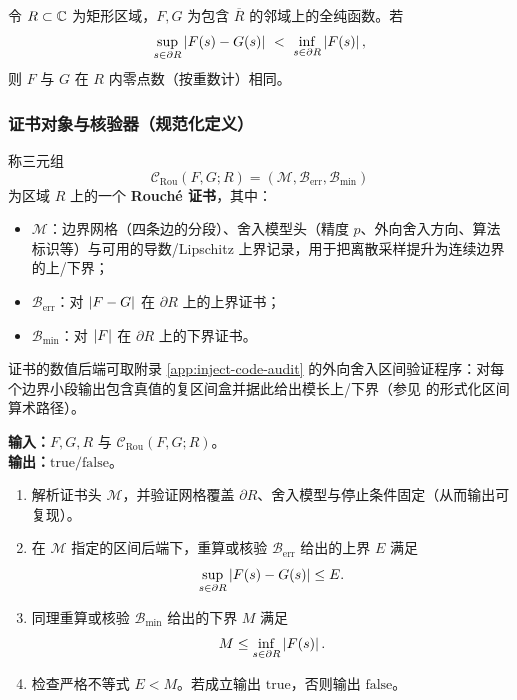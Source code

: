 \begin{lemma}\label{lem:rouche}
令 $R\subset\mathbb{C}$ 为矩形区域，$F,G$ 为包含 $\overline{R}$ 的邻域上的全纯函数。若
$$
\sup_{s\in\partial R}\left\lvert F(s)-G(s)\right\rvert\ <\ \inf_{s\in\partial R}\left\lvert F(s)\right\rvert,
$$
则 $F$ 与 $G$ 在 $R$ 内零点数（按重数计）相同。
\end{lemma}

\subsubsection{证书对象与核验器（规范化定义）}

\begin{definition}\label{def:rouche-cert}
称三元组
$$
\mathcal{C}_{\mathrm{Rou}}(F,G;R)=(\mathcal{M},\mathcal{B}_{\mathrm{err}},\mathcal{B}_{\min})
$$
为区域 $R$ 上的一个 \textbf{Rouché 证书}，其中：
\begin{itemize}
  \item $\mathcal{M}$：边界网格（四条边的分段）、舍入模型头（精度 $p$、外向舍入方向、算法标识等）与可用的导数/Lipschitz 上界记录，用于把离散采样提升为连续边界的上/下界；
  \item $\mathcal{B}_{\mathrm{err}}$：对 $\left\lvert F-G\right\rvert$ 在 $\partial R$ 上的上界证书；
  \item $\mathcal{B}_{\min}$：对 $\left\lvert F\right\rvert$ 在 $\partial R$ 上的下界证书。
\end{itemize}
证书的数值后端可取附录 \ref{app:inject-code-audit} 的外向舍入区间验证程序：对每个边界小段输出包含真值的复区间盒并据此给出模长上/下界（参见 \cite{DaumasLesterMunoz2007} 的形式化区间算术路径）。
\end{definition}

\begin{algorithm}\label{alg:check-rou}
\textbf{输入：}$F,G,R$ 与 $\mathcal{C}_{\mathrm{Rou}}(F,G;R)$。\\
\textbf{输出：}$\mathrm{true/false}$。
\begin{enumerate}
  \item 解析证书头 $\mathcal{M}$，并验证网格覆盖 $\partial R$、舍入模型与停止条件固定（从而输出可复现）。
  \item 在 $\mathcal{M}$ 指定的区间后端下，重算或核验 $\mathcal{B}_{\mathrm{err}}$ 给出的上界 $E$ 满足
  $$
  \sup_{s\in\partial R}\left\lvert F(s)-G(s)\right\rvert\le E.
  $$
  \item 同理重算或核验 $\mathcal{B}_{\min}$ 给出的下界 $M$ 满足
  $$
  M\le \inf_{s\in\partial R}\left\lvert F(s)\right\rvert.
  $$
  \item 检查严格不等式 $E<M$。若成立输出 $\mathrm{true}$，否则输出 $\mathrm{false}$。
\end{enumerate}
\end{algorithm}

